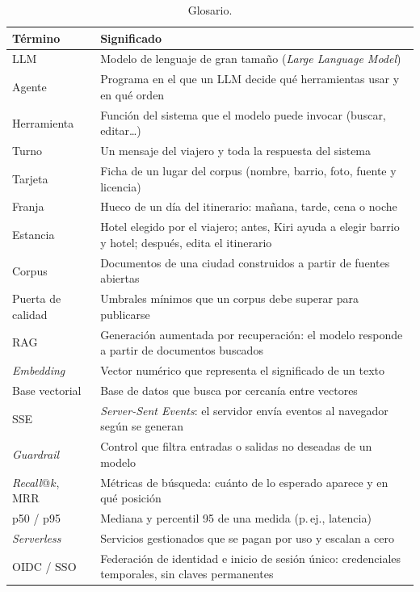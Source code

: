 \begin{table}[h]
\centering\scriptsize
\caption{Glosario.}\label{tab:glosario}
\begin{tabularx}{\columnwidth}{@{}L{1.9cm}Y@{}}
\toprule
\textbf{Término} & \textbf{Significado} \\
\midrule
LLM & Modelo de lenguaje de gran tamaño (\emph{Large Language Model}) \\
Agente & Programa en el que un LLM decide qué herramientas usar y en qué orden \\
Herramienta & Función del sistema que el modelo puede invocar (buscar, editar\ldots) \\
Turno & Un mensaje del viajero y toda la respuesta del sistema \\
Tarjeta & Ficha de un lugar del corpus (nombre, barrio, foto, fuente y licencia) \\
Franja & Hueco de un día del itinerario: mañana, tarde, cena o noche \\
Estancia & Hotel elegido por el viajero; antes, Kiri ayuda a elegir barrio y hotel; después, edita el itinerario \\
Corpus & Documentos de una ciudad construidos a partir de fuentes abiertas \\
Puerta de calidad & Umbrales mínimos que un corpus debe superar para publicarse \\
RAG & Generación aumentada por recuperación: el modelo responde a partir de documentos buscados \\
\emph{Embedding} & Vector numérico que representa el significado de un texto \\
Base vectorial & Base de datos que busca por cercanía entre vectores \\
SSE & \emph{Server-Sent Events}: el servidor envía eventos al navegador según se generan \\
\emph{Guardrail} & Control que filtra entradas o salidas no deseadas de un modelo \\
\emph{Recall}@$k$, MRR & Métricas de búsqueda: cuánto de lo esperado aparece y en qué posición \\
p50 / p95 & Mediana y percentil 95 de una medida (p.\,ej., latencia) \\
\emph{Serverless} & Servicios gestionados que se pagan por uso y escalan a cero \\
OIDC / SSO & Federación de identidad e inicio de sesión único: credenciales temporales, sin claves permanentes \\
\bottomrule
\end{tabularx}
\end{table}
